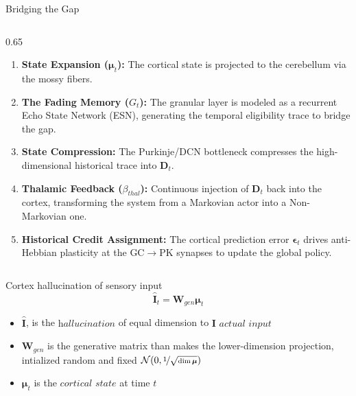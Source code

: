 \documentclass{beamer}
\begin{document}
\begin{frame}{Bridging the Gap}
\begin{columns}[T]
			\begin{column}{0.65\textwidth}			
				\begin{enumerate}
					\small
					\item \textcolor{green!60!black}{\textbf{State Expansion ($\boldsymbol{\mu}_t$):}} The cortical state is projected to the cerebellum via the mossy fibers.
					\item \textcolor{green!60!black}{\textbf{The Fading Memory ($G_t$):}} The granular layer is modeled as a recurrent Echo State Network (ESN), generating the temporal eligibility trace to bridge the gap.
					\item \textcolor{green!60!black}{\textbf{State Compression:}} The Purkinje/DCN bottleneck compresses the high-dimensional historical trace into $\mathbf{D}_t$.
					\item \textcolor{green!60!black}{\textbf{Thalamic Feedback ($\beta_{thal}$):}} Continuous injection of $\mathbf{D}_t$ back into the cortex, transforming the system from a Markovian actor into a Non-Markovian one.
					\item \textcolor{green!60!black}{\textbf{Historical Credit Assignment:}} The cortical prediction error $\boldsymbol{\epsilon}_t$ drives anti-Hebbian plasticity at the GC$\rightarrow$PK synapses to update the global policy.
				\end{enumerate}
			\end{column}
		\end{columns}
	\end{frame}
	
		\begin{frame}{Cortex hallucination of sensory input}
		\begin{equation}
			\hat{\mathbf{I}}_t = \mathbf{W}_{gen} \boldsymbol{\mu}_{t}
		\end{equation}
		\begin{itemize}
			\item $\hat{\mathbf{I}}$, is the $\textit{hallucination}$ of equal dimension to $\mathbf{I}$ $\textit{actual input}$
			\item $\mathbf{W}_{gen}$ is the generative matrix than makes the lower-dimension projection, intialized random and fixed $\mathcal{N}(0, \nicefrac{1}{\sqrt{\dim{\boldsymbol{\mu}}}})$
			\item $\boldsymbol{\mu}_{t}$ is the $\textit{cortical state}$ at time $t$
		\end{itemize}
	\end{frame}
	
\end{document}
